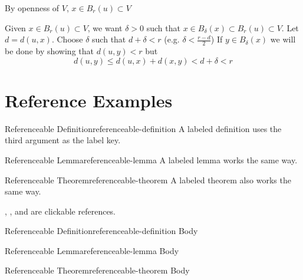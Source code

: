 \documentclass{report}
\begin{document}
\begin{myproof}By openness of $V$, $x\in B_r(u)\subset V$
	\begin{center}
	\end{center}

	Given $x\in B_r(u)\subset V$, we want $\delta>0$ such that $x\in B_{\delta} (x)\subset B_r(u)\subset V$. Let $d=d(u,x)$. Choose $\delta $ such that $d+\delta<r$ (e.g. $\delta<\frac{r-d}{2}$) If $y\in B_{\delta}(x)$ we will be done by showing that $d(u,y)<r$ but $$d(u,y)\leq d(u,x)+d(x,y)<d+\delta<r$$
\end{myproof}

\section{Reference Examples}

\begin{Definition}{Referenceable Definition}{referenceable-definition}
	A labeled definition uses the third argument as the label key.
\end{Definition}

\begin{Lemma}{Referenceable Lemma}{referenceable-lemma}
	A labeled lemma works the same way.
\end{Lemma}

\begin{theorem}{Referenceable Theorem}{referenceable-theorem}
	A labeled theorem also works the same way.
\end{theorem}

, , and
 are clickable references.

\begin{latexcodeblock}[title={Reference Syntax}]
	\begin{Definition}{Referenceable Definition}{referenceable-definition}
		Body
	\end{Definition}

	\begin{Lemma}{Referenceable Lemma}{referenceable-lemma}
		Body
	\end{Lemma}

	\begin{theorem}{Referenceable Theorem}{referenceable-theorem}
		Body
	\end{theorem}

\end{latexcodeblock}
\end{document}
